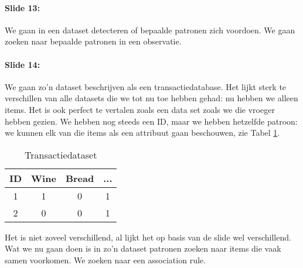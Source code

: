 \documentclass[10pt,a4paper]{report}
\begin{document}
\paragraph{Slide 13:}We gaan in een dataset detecteren of bepaalde patronen zich voordoen. We gaan zoeken naar bepaalde patronen in een observatie.

\paragraph{Slide 14:}We gaan zo'n dataset beschrijven als een transactiedatabase. Het lijkt sterk te verschillen van alle datasets die we tot nu toe hebben gehad: nu hebben we alleen items. Het is ook perfect te vertalen zoals een data set zoals we die vroeger hebben gezien. We hebben nog steeds een ID, maar we hebben hetzelfde patroon: we kunnen elk van die items als een attribuut gaan beschouwen, zie Tabel \ref{wine_bread}.

\begin{table}[h!]
\centering
\begin{tabular}{|c|c|c|c|}
\hline
ID	&	Wine	&	Bread 	&	...	\\	\hline	\hline
1	&	1		&	0		&	1	\\	\hline
2	&	0		&	0		&	1	\\	\hline
\end{tabular}
\caption{Transactiedataset}
\label{wine_bread}
\end{table}

Het is niet zoveel verschillend, al lijkt het op basis van de slide wel verschillend. Wat we nu gaan doen is in zo'n dataset patronen zoeken naar items die vaak samen voorkomen. We zoeken naar een association rule.
\end{document}
